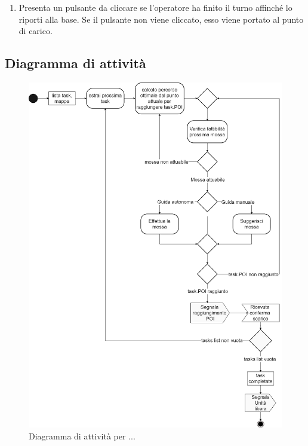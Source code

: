 \begin{itemize}
{\begin{enumerate}
\begin{enumerate}
\begin{itemize}
\begin{itemize}
				\end{itemize}				
				\item{attende la conferma dell'operatore che dichiara di aver eseguito lo scarico\\}
			\end{itemize}						
			\item{passa alla task successiva\\}				
		\end{enumerate}
		\item{Presenta un pulsante da cliccare se l'operatore ha finito il turno affinché lo riporti alla base. Se il pulsante non viene cliccato, esso viene portato al punto di carico. \\}
	\end{enumerate}
	}
\end{itemize}
\subsection{Diagramma di attività}
\begin{figure}[H]
	\centering
	\includegraphics[scale=0.3]{res/images/diagramma_di_attivita2.png}
	\caption{Diagramma di attività per ...}
\end{figure}
